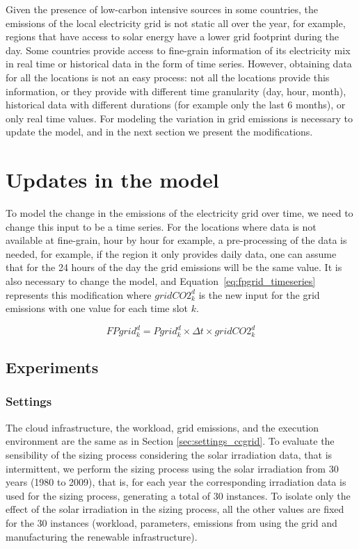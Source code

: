 Given the presence of low-carbon intensive sources in some countries, the emissions of the local electricity grid is not static all over the year, for example, regions that have access to solar energy have a lower grid footprint during the day. Some countries provide access to fine-grain information of its electricity mix in real time or historical data in the form of time series. However, obtaining data for all the locations is not an easy process: not all the locations provide this information, or they provide with different time granularity (day, hour, month), historical data with different durations (for example only the last 6 months), or only real time values. For modeling the variation in grid emissions is necessary to update the model, and in the next section we present the modifications.

\section{Updates in the model}

To model the change in the emissions of the electricity grid over time, we need to change this input to be a time series. For the locations where data is not available at fine-grain, hour by hour for example, a pre-processing of the data is needed, for example, if the region it only provides daily data, one can assume that for the 24 hours of the day the grid emissions  will be the same value. It is also necessary to change the model, and Equation~\eqref{eq:fpgrid_timeseries} represents this modification where $gridCO2^d_k$ is the new input for the grid emissions with one value for each time slot $k$.


\begin{equation} \label{eq:fpgrid_timeseries}
FPgrid_k^d = Pgrid_k^d\times \Delta t \times gridCO2^d_k
\end{equation}

\subsection{Experiments}

\subsubsection{Settings}

The cloud infrastructure, the workload, grid emissions, and the execution environment are the same as in Section  \ref{sec:settings_ccgrid}. To evaluate the sensibility of the sizing process considering the solar irradiation data, that is intermittent, we perform the sizing process using the solar irradiation from 30 years (1980 to 2009), that is, for each year the corresponding irradiation data is used for the sizing process, generating a total of 30 instances. To isolate only the effect of the solar irradiation in the sizing process, all the other values are fixed for the 30 instances (workload, parameters,  emissions from using the grid and manufacturing the renewable infrastructure).


